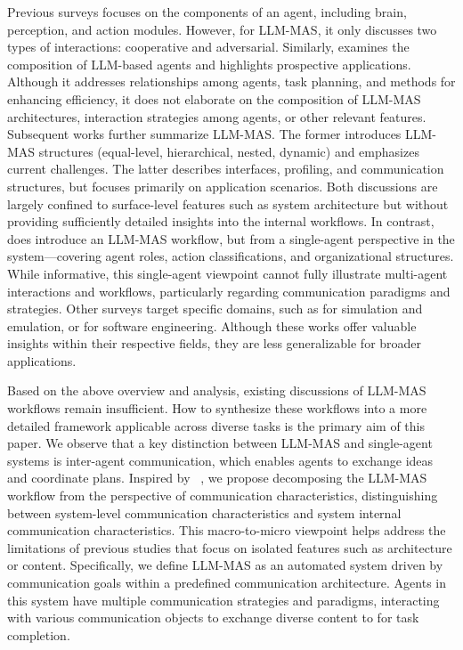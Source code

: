 Previous surveys \cite{agent_survey_2} focuses on the components of an agent, including brain, perception, and action modules. However, for LLM-MAS, it only discusses two types of interactions: cooperative and adversarial. Similarly, \cite{agent_survey_1} examines the composition of LLM-based agents and highlights prospective applications. Although it addresses relationships among agents, task planning, and methods for enhancing efficiency, it does not elaborate on the composition of LLM-MAS architectures, interaction strategies among agents, or other relevant features. Subsequent works \cite{mas_survey_3,mas_survey_2} further summarize LLM-MAS. The former introduces LLM-MAS structures (equal-level, hierarchical, nested, dynamic) and emphasizes current challenges. The latter describes interfaces, profiling, and communication structures, but focuses primarily on application scenarios. Both discussions are largely confined to surface-level features such as system architecture but without providing sufficiently detailed insights into the internal workflows. In contrast, \cite{mas_survey_1} does introduce an LLM-MAS workflow, but from a single-agent perspective in the system—covering agent roles, action classifications, and organizational structures. While informative, this single-agent viewpoint cannot fully illustrate multi-agent interactions and workflows, particularly regarding communication paradigms and strategies. Other surveys target specific domains, such as \cite{mas_application_survey_simulation} for simulation and emulation, or \cite{mas_application_survey_1,mas_application_survey_2} for software engineering. Although these works offer valuable insights within their respective fields, they are less generalizable for broader applications.

Based on the above overview and analysis, existing discussions of LLM-MAS workflows remain insufficient. How to synthesize these workflows into a more detailed framework applicable across diverse tasks is the primary aim of this paper. We observe that a key distinction between LLM-MAS and single-agent systems is inter-agent communication, which enables agents to exchange ideas and coordinate plans. Inspired by ~\cite{communication_1,communication_2}, we propose decomposing the LLM-MAS workflow from the perspective of communication characteristics, distinguishing between system-level communication characteristics and system internal communication characteristics. This macro-to-micro viewpoint helps address the limitations of previous studies that focus on isolated features such as architecture or content. Specifically, we define LLM-MAS as an automated system driven by communication goals within a predefined communication architecture. Agents in this system have multiple communication strategies and paradigms, interacting with various communication objects to exchange diverse content to for task completion.


